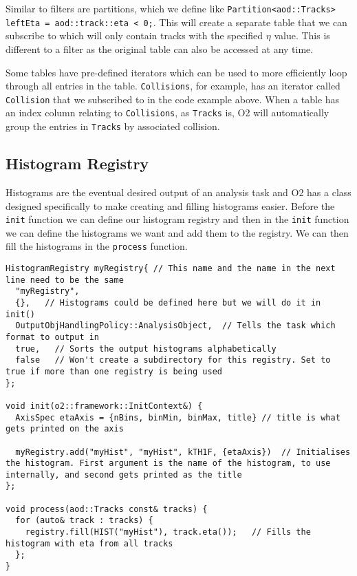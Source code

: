 Similar to filters are partitions, which we define like \texttt{Partition<aod::Tracks> leftEta = aod::track::eta < 0;}. This will create a separate table that we can subscribe to which will only contain tracks with the specified $\eta$ value. This is different to a filter as the original table can also be accessed at any time. 

Some tables have pre-defined iterators which can be used to more efficiently loop through all entries in the table. \texttt{Collisions}, for example, has an iterator called \texttt{Collision} that we subscribed to in the code example above. When a table has an index column relating to \texttt{Collisions}, as \texttt{Tracks} is, O2 will automatically group the entries in \texttt{Tracks} by associated collision. 

\subsection{Histogram Registry}
Histograms are the eventual desired output of an analysis task and O2 has a class designed specifically to make creating and filling histograms easier. Before the \texttt{init} function we can define our histogram registry and then in the \texttt{init} function we can define the histograms we want and add them to the registry. We can then fill the histograms in the \texttt{process} function.

\begin{verbatim}
HistogramRegistry myRegistry{ // This name and the name in the next line need to be the same
  "myRegistry",
  {},   // Histograms could be defined here but we will do it in init()
  OutputObjHandlingPolicy::AnalysisObject,  // Tells the task which format to output in
  true,   // Sorts the output histograms alphabetically
  false   // Won't create a subdirectory for this registry. Set to true if more than one registry is being used
};

void init(o2::framework::InitContext&) {
  AxisSpec etaAxis = {nBins, binMin, binMax, title} // title is what gets printed on the axis

  myRegistry.add("myHist", "myHist", kTH1F, {etaAxis})  // Initialises the histogram. First argument is the name of the histogram, to use internally, and second gets printed as the title
};

void process(aod::Tracks const& tracks) {
  for (auto& track : tracks) {
    registry.fill(HIST("myHist"), track.eta());   // Fills the histogram with eta from all tracks
  };
}
\end{verbatim}


